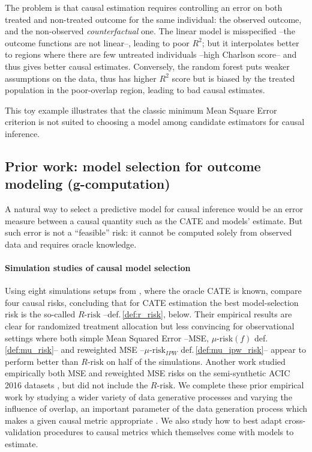 \documentclass[french,12pt,twoside,a4paper]{book}
\begin{document}
The problem is that causal estimation requires controlling
an error on both treated and non-treated outcome for the same individual:
the observed outcome, and the non-observed \emph{counterfactual} one.
The linear model is misspecified --the outcome functions are not
linear--, leading to poor $R^2$; but it interpolates better to regions
where there are few untreated individuals --high Charlson score-- and
thus gives better causal estimates. Conversely, the random forest puts
weaker assumptions on the data, thus has higher $R^2$ score but is biased
by the treated population in the poor-overlap region, leading
to bad causal estimates.

This toy example illustrates that the classic minimum Mean Square Error
criterion is not suited to choosing a model among candidate
estimators for causal inference.

\subsection{Prior work: model selection for outcome modeling (g-computation)}\label{subsec:causal_model_selection:prior_work}%


A natural way to select a predictive model for causal inference would be
an error measure between a causal quantity such as the CATE and models' estimate. But such error is
not a ``feasible'' risk: it cannot be computed solely from observed data
and requires oracle knowledge.


\paragraph{Simulation studies of causal model selection}

Using eight simulations setups from \cite{powers_methods_2018}, where
the oracle CATE is known, \citet{schuler_comparison_2018} compare four
causal risks, concluding that for CATE estimation the best
model-selection risk is the so-called $R\text{-risk}$
\citep{nie_quasioracle_2017} --def.\,\ref{def:r_risk}, below. Their
empirical results are clear for randomized treatment allocation but less
convincing for observational settings where both simple Mean Squared
Error --MSE, $\mu\text{-risk}(f)$ def.\,\ref{def:mu_risk}-- and
reweighted MSE --$\mu\text{-risk}_{IPW}$ def.\,\ref{def:mu_ipw_risk}--
appear to perform better than $R\text{-risk}$ on half of the simulations.
Another work \citep{alaa_validating_2019} studied empirically both MSE and
reweighted MSE risks on the semi-synthetic ACIC 2016 datasets
\citep{dorie_automated_2019}, but did not include the $R\text{-risk}$. We complete these
prior empirical work by studying a wider variety of data generative
processes and varying the influence of overlap, an important parameter of
the data generation process which makes a given causal metric appropriate
\citep{damour_overlap_2020}. We also study how to best adapt
cross-validation procedures to causal metrics which themselves come with
models to estimate.
\end{document}

